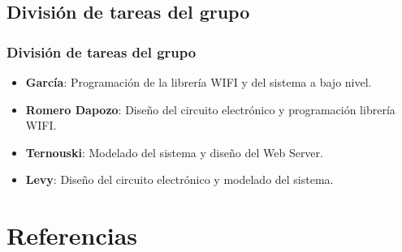 \subsection{División de tareas del grupo}
\begin{frame}
	\frametitle{División de tareas del grupo}
	\begin{itemize}
		\item \textbf{García}: Programación de la librería WIFI y del sistema a bajo nivel.
		\item \textbf{Romero Dapozo}: Diseño del circuito electrónico y programación librería WIFI.
		\item \textbf{Ternouski}: Modelado del sistema y diseño del Web Server.
		\item \textbf{Levy}: Diseño del circuito electrónico y modelado del sistema.
	\end{itemize}
\end{frame}

\section{Referencias}

